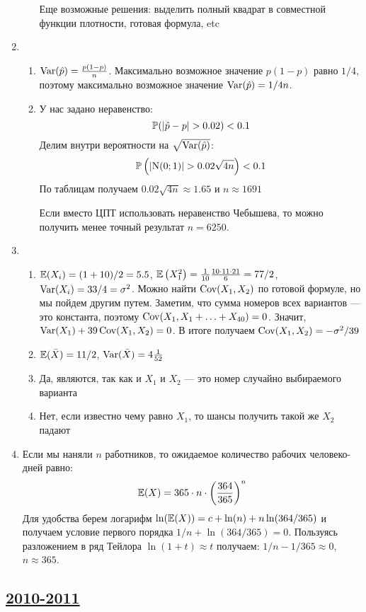\begin{enumerate}
\begin{enumerate}
Еще возможные решения: выделить полный квадрат в совместной функции плотности, готовая формула, etc
\end{enumerate}
\item
\begin{enumerate}
\item $\Var(\hat{p}) = \frac{p(1-p)}{n}$. Максимально возможное значение $p(1-p)$
равно $1/4$, поэтому максимально возможное значение $\Var(\hat{p})=1/4n$.
\item У нас задано неравенство:
\[
\P(|\hat{p} - p| > 0.02) < 0.1
\]
Делим внутри вероятности на $\sqrt{\Var(\hat{p})}$:
\[
\P\left(|\cN(0;1)| > 0.02 \sqrt{4n} \right) < 0.1
\]
По таблицам получаем $0.02 \sqrt{4n} \approx 1.65$ и $n \approx 1691$

Если вместо ЦПТ использовать неравенство Чебышева, то можно получить менее точный
результат $n=6250$.
\end{enumerate}
\item
\begin{enumerate}
\item $\E(X_i) = (1 + 10) / 2 = 5.5$, $\E\left(X_1^2\right) = \frac{1}{10} \frac{10\cdot 11\cdot 21}{6}=77/2$,
$\Var(X_i) = 33/4 = \sigma^2$.
Можно найти $\Cov(X_1, X_2)$ по готовой формуле, но мы пойдем другим путем.
Заметим, что сумма номеров всех вариантов — это константа, поэтому
$\Cov(X_1, X_1 + \ldots + X_{40}) = 0$. Значит, $\Var(X_1) + 39\Cov(X_1, X_2) = 0$.
В итоге получаем $\Cov(X_1, X_2) = -\sigma^2 / 39$
\item $\E(\bar{X})=11/2$, $\Var(\bar{X})=4\frac{1}{52}$
\item Да, являются, так как и $X_1$ и $X_2$ — это номер случайно выбираемого варианта
\item Нет, если известно чему равно $X_1$, то шансы получить такой же $X_2$ падают
\end{enumerate}
\item
Если мы наняли $n$ работников, то ожидаемое количество рабочих человеко-дней равно:
\[
\E(X)=365\cdot n\cdot \left(\frac{364}{365}\right)^{n}
\]
Для удобства берем логарифм $\ln(\E(X))=c+\ln(n)+n\ln(364/365)$ и получаем условие
первого порядка $1/n+\ln(364/365)=0$. 
Пользуясь разложением в ряд Тейлора $\ln(1 + t) \approx t$ получаем: 
$1/n-1/365\approx 0$, $n\approx 365$.
\end{enumerate}



\subsection[2010-2011]{\hyperref[sec:kr_02_2010_2011]{2010-2011}}
\label{sec:sol_kr_02_2010_2011}


